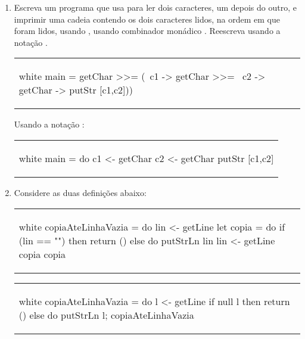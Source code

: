 \begin{enumerate}

\item Escreva um programa que usa  para ler dois
  caracteres, um depois do outro, e imprimir uma cadeia contendo os
  dois caracteres lidos, na ordem em que foram lidos, usando
  , usando combinador monádico \ina{(>>=)}. Reescreva
  usando a notação .

\begin{center}
\begin{tabular}{l}
\begin{alg}{.5\textwidth}{white}
  main = getChar >>=
            (\ c1 -> getChar >>=
            \ c2 -> getChar -> putStr [c1,c2]))
\end{alg}
\end{tabular}
\end{center}

Usando a notação :

\begin{center}
\begin{tabular}{l}
\begin{alg}{.5\textwidth}{white}
main = do c1 <- getChar
          c2 <- getChar
          putStr [c1,c2]
\end{alg}
\end{tabular}
\end{center}

\item Considere as duas definições abaixo:

\begin{center}
\begin{tabular}{l}
\begin{alg}{.5\textwidth}{white}
copiaAteLinhaVazia = do lin <- getLine
                        let copia = do
                              if (lin == "")
                                then return ()
                                else do putStrLn lin
                                        lin <- getLine
                                        copia
                        copia
\end{alg}
\end{tabular}
\end{center}

\begin{center}
\begin{tabular}{l}
\begin{alg}{.5\textwidth}{white}
copiaAteLinhaVazia = do 
  l <- getLine
  if null l then return ()
            else do {putStrLn l; copiaAteLinhaVazia}
\end{alg}
\end{tabular}
\end{center}


\end{enumerate}

